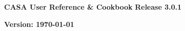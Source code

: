 \pagestyle{empty}

\begin{center}
\Huge
{\bf CASA User Reference \& Cookbook} 
\break 
\break 
\huge
{\bf Release 3.0.1}
\break 
\end{center}
\normalsize

\begin{figure}[h!]
\begin{center}
\end{center}
\end{figure}


\Large
\begin{center}
{\bf Version: \today}
\end{center}
\normalsize

\pagebreak

